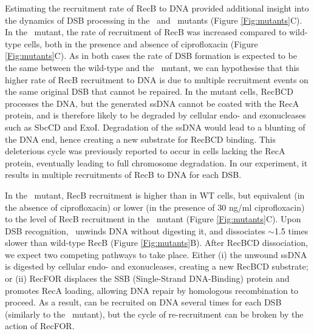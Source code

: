 Estimating the recruitment rate of RecB to DNA provided additional insight into the dynamics of DSB processing in the \dreca\ and \geneteneighty\ mutants (Figure \ref{Fig:mutants}C). In the \dreca\ mutant, the rate of recruitment of RecB was increased compared to wild-type cells, both in the presence and absence of ciprofloxacin (Figure \ref{Fig:mutants}C). As in both cases the rate of DSB formation is expected to be the same between the wild-type and the \dreca\ mutant, we can hypothesise that this higher rate of RecB recruitment to DNA is due to multiple recruitment events on the same original DSB that cannot be repaired. In the mutant cells, RecBCD processes the DNA, but the generated ssDNA cannot be coated with the RecA protein, and is therefore likely to be degraded by cellular endo- and exonucleases such as SbcCD and ExoI\cite{Zahradka2009}. Degradation of the ssDNA would lead to a blunting of the DNA end, hence creating a new substrate for RecBCD binding. This deleterious cycle was previously reported to occur in cells lacking the RecA protein, eventually leading to full chromosome degradation\cite{Capaldo1975,Skarstad1993}. In our experiment, it results in multiple recruitments of RecB to DNA for each DSB.

In the \geneteneighty\ mutant, RecB recruitment is higher than in WT cells, but equivalent (in the absence of ciprofloxacin) or lower (in the presence of 30 ng/ml ciprofloxacin) to the level of RecB recruitment in the \dreca\ mutant (Figure \ref{Fig:mutants}C). Upon DSB recognition, \teneighty\ unwinds DNA without digesting it, and dissociates $\sim$1.5 times slower than wild-type RecB (Figure \ref{Fig:mutants}B). After RecBCD dissociation, we expect two competing pathways to take place. Either (i) the unwound ssDNA is digested by cellular endo- and exonucleases, creating a new RecBCD substrate; or (ii) RecFOR displaces the SSB (Single-Strand DNA-Binding) protein and promotes RecA loading, allowing DNA repair by homologous recombination to proceed\cite{Ivancic-Bace_2003}. As a result, \teneighty can be recruited on DNA several times for each DSB (similarly to the \dreca\ mutant), but the cycle of re-recruitment can be broken by the action of RecFOR.



